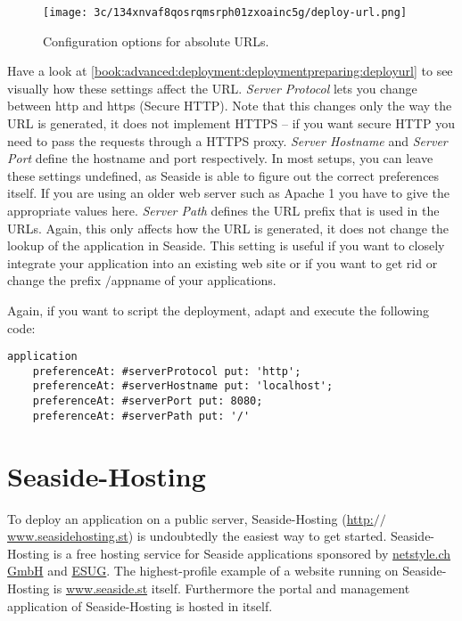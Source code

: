 \documentclass[a4paper,10pt,twoside]{book}
\newcommand{\ct}[1]{{\small\ttfamily\textup{#1}}}
\begin{document}
\begin{figure}[h!tbp]
	\begin{center}
		\texttt{[image: 3c/134xnvaf8qosrqmsrph01zxoainc5g/deploy-url.png]}
		\caption{Configuration options for absolute URLs.\label{book:advanced:deployment:deploymentpreparing:deployurl}}
	\end{center}
\end{figure}


Have a look at \autoref{book:advanced:deployment:deploymentpreparing:deployurl} to see visually how these settings affect the URL. \textit{Server Protocol} lets you change between \ct{http} and \ct{https} (Secure HTTP). Note that this changes only the way the URL is generated, it does not implement HTTPS -- if you want secure HTTP you need to pass the requests through a HTTPS proxy. \textit{Server Hostname} and \textit{Server Port} define the hostname and port respectively. In most setups, you can leave these settings undefined, as Seaside is able to figure out the correct preferences itself. If you are using an older web server such as Apache 1 you have to give the appropriate values here. \textit{Server Path} defines the URL prefix that is used in the URLs. Again, this only affects how the URL is generated, it does not change the lookup of the application in Seaside. This setting is useful if you want to closely integrate your application into an existing web site or if you want to get rid or change the prefix \ct{$/$appname} of your applications.

Again, if you want to script the deployment, adapt and execute the following code:

\begin{lstlisting}
application
    preferenceAt: #serverProtocol put: 'http';
    preferenceAt: #serverHostname put: 'localhost';
    preferenceAt: #serverPort put: 8080;
    preferenceAt: #serverPath put: '/'
\end{lstlisting}

\section{Seaside-Hosting}
\label{book:advanced:deployment:deploymentseasidehosting}

To deploy an application on a public server, Seaside-Hosting (\href{http://www.seasidehosting.st}{http:$/$$/$www.seasidehosting.st}) is undoubtedly the easiest way to get started. Seaside-Hosting is a free hosting service for Seaside applications sponsored by \href{http://www.netstyle.ch}{netstyle.ch GmbH} and \href{http://www.esug.org}{ESUG}. The highest-profile example of a website running on Seaside-Hosting is \href{http://www.seaside.st}{www.seaside.st} itself. Furthermore the portal and management application of Seaside-Hosting is hosted in itself.
\end{document}
